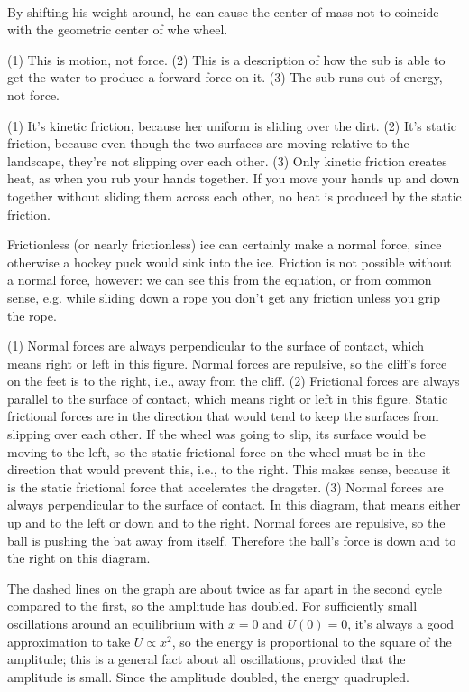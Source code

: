 \noindent{}\\
By shifting his weight around, he can cause the center of mass not to coincide
with the geometric center of whe wheel.

(1) This is motion, not force. (2) This is a description of how the
 sub is able to get the water to produce a forward
force on it. (3) The sub runs out of energy, not force.

(1) It's kinetic friction, because her uniform is sliding over
 the dirt. (2) It's static friction, because even though the
two surfaces are moving relative to the landscape, they're not slipping
 over each other. (3) Only kinetic friction
creates heat, as when you rub your hands together. If you
 move your hands up and down together without sliding
them across each other, no heat is produced by the static friction.


Frictionless (or nearly frictionless) ice can certainly make
a normal force, since otherwise a hockey puck would sink into the ice. Friction
is not possible without a normal force, however: we can see this from the equation,
or from common sense, e.g. while sliding down a rope you don't get any friction
unless you grip the rope.

(1) Normal forces are always perpendicular to the surface of contact,
 which means right or left in this figure. Normal
forces are repulsive, so the cliff's force on the feet
 is to the right, i.e., away from the cliff.  (2) Frictional forces are
always parallel to the surface of contact, which means right or left
 in this figure. Static frictional forces are in the
direction that would tend to keep the surfaces from slipping over
 each other. If the wheel was going to slip, its
surface would be moving to the left, so the static frictional force on
 the wheel must be in the direction that would
prevent this, i.e., to the right. This makes sense, because it is
 the static frictional force that accelerates the
dragster.  (3) Normal forces are always perpendicular to the surface of
 contact. In this diagram, that means either
up and to the left or down and to the right. Normal forces are 
repulsive, so the ball is pushing the bat away from
itself. Therefore the ball's force is down and to the right on this diagram.

The dashed lines on the graph are about twice as far apart in the second cycle compared
to the first, so the amplitude has doubled. For sufficiently small oscillations around an equilibrium
with $x=0$ and $U(0)=0$, it's always a good approximation to take $U\propto x^2$, so the energy
is proportional to the square of the amplitude; this is a general fact about all oscillations,
provided that the amplitude is small. Since the amplitude doubled, the energy quadrupled.

